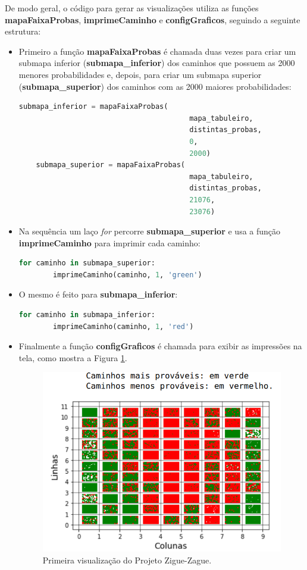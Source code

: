 \documentclass[12pt]{article}
\begin{document}
De modo geral, o código para gerar as visualizações utiliza as funções \textbf{mapaFaixaProbas}, \textbf{imprimeCaminho} e \textbf{configGraficos}, seguindo a seguinte estrutura: 

\begin{itemize}
	\item Primeiro a função \textbf{mapaFaixaProbas} é chamada duas vezes para criar um submapa inferior (\textbf{submapa\_inferior}) dos caminhos que possuem as 2000 menores probabilidades e, depois, para criar um submapa superior (\textbf{submapa\_superior}) dos caminhos com as 2000 maiores probabilidades:
	
	\begin{lstlisting}[language=Python]
	submapa_inferior = mapaFaixaProbas(
										mapa_tabuleiro, 
										distintas_probas, 
										0, 
										2000)
	submapa_superior = mapaFaixaProbas(
										mapa_tabuleiro, 
										distintas_probas, 
										21076, 
										23076)
	\end{lstlisting}
	\item Na sequência um laço \textit{for} percorre \textbf{submapa\_superior} e usa a função \textbf{imprimeCaminho} para imprimir cada caminho:
	\begin{lstlisting}[language=Python]
	for caminho in submapa_superior:
		imprimeCaminho(caminho, 1, 'green')
	\end{lstlisting} 
	\item O mesmo é feito para \textbf{submapa\_inferior}:
	\begin{lstlisting}[language=Python]
	for caminho in submapa_inferior:
		imprimeCaminho(caminho, 1, 'red')
	\end{lstlisting}
	\item Finalmente a função \textbf{configGraficos} é chamada para exibir as impressões na tela, como mostra a Figura \ref{primeira_visualizacao}.
	
	\begin{figure}[ht!]
		\centering
		\includegraphics[width=0.7\linewidth]{img/primeira_visualizacao.png}
		\caption{Primeira visualização do Projeto Zigue-Zague.}
		\label{primeira_visualizacao}
	\end{figure}
\end{itemize}
\end{document}
